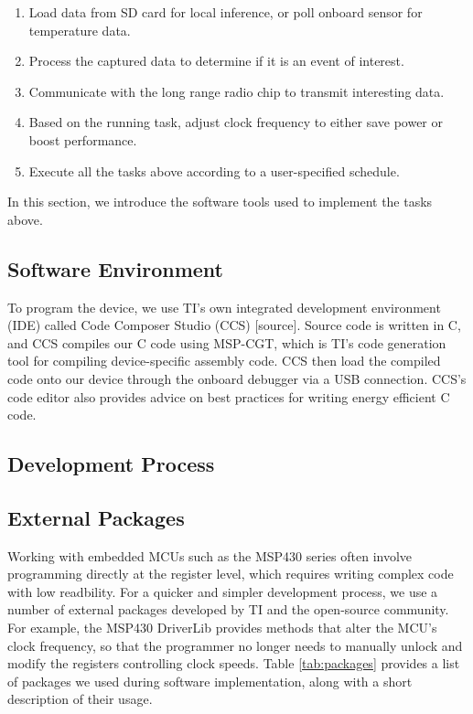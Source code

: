 \documentclass[twoside]{report}
\begin{document}
\begin{enumerate}
    \item Load data from SD card for local inference, or poll onboard sensor for temperature data.
    \item Process the captured data to determine if it is an event of interest.
    \item Communicate with the long range radio chip to transmit interesting data.
    \item Based on the running task, adjust clock frequency to either save power or boost performance.
    \item Execute all the tasks above according to a user-specified schedule.
\end{enumerate}

In this section, we introduce the software tools used to implement the tasks above.

\subsection{Software Environment}
To program the device, we use TI's own integrated development environment (IDE) called 
Code Composer Studio (CCS) [source]. Source code is written in C, and CCS compiles our C code using MSP-CGT, 
which is TI's code generation tool for compiling device-specific assembly code. CCS then load the compiled code onto 
our device through the onboard debugger via a USB connection. CCS's code editor also provides advice 
on best practices for writing energy efficient C code.

\subsection{Development Process}


\subsection{External Packages}
Working with embedded MCUs such as the MSP430 series often involve programming directly at the register level, 
which requires writing complex code with low readbility. 
For a quicker and simpler development process, we use a number of external packages developed by TI and 
the open-source community. For example, the MSP430 DriverLib provides methods that alter the MCU's clock frequency, 
so that the programmer no longer needs to manually unlock and modify the registers controlling clock speeds.
Table \ref{tab:packages} provides a list of packages we used during software 
implementation, along with a short description of their usage.
\end{document}
